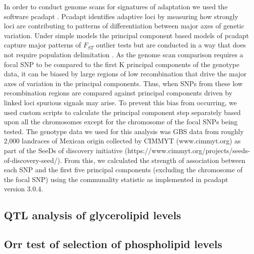 \documentclass[9pt,twocolumn,twoside,lineno]{gsajnl}
\begin{document}
In order to conduct genome scans for signatures of adaptation we used the software pcadapt \citep{Luu2017-ws}.
Pcadapt identifies adaptive loci by measuring how strongly loci are contributing to patterns of differentiation between major axes of genetic variation.
Under simple models the principal component based models of pcadapt capture major patterns of $F_{ST}$ outlier tests but are conducted in a way that does not require population delimitation \citep{duforet2014genome}.
As the genome scan comparison requires a focal SNP to be compared to the first K principal components of the genotype data, it can be biased by large regions of low recombination that drive the major axes of variation in the principal components.
Thus, when SNPs from these low recombination regions are compared against principal components driven by linked loci spurious signals may arise.
To prevent this bias from occurring, we used custom scripts to calculate the principal component step separately based upon all the chromosomes except for the chromosome of the focal SNPs being tested.
The genotype data we used for this analysis was GBS data from roughly 2,000 landraces of Mexican origin collected by CIMMYT (www.cimmyt.org) as part of the SeeDs of discovery initiative (https://www.cimmyt.org/projects/seeds-of-discovery-seed/).
From this, we calculated the strength of association between each SNP and the first five principal components (excluding the chromosome of the focal SNP) using the communality statistic as implemented in pcadapt version 3.0.4.


\subsection{QTL analysis of glycerolipid levels}

\subsection{Orr test of selection of phospholipid levels}
\end{document}
